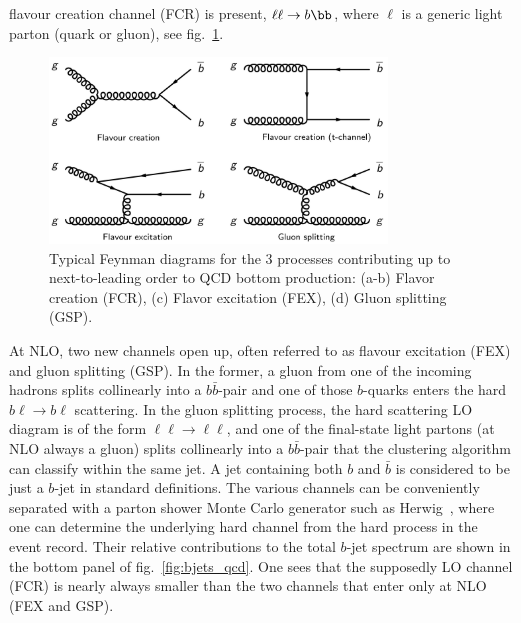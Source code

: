 flavour creation channel (FCR) is present, $\ell \ell \to b\bb$, where $\ell$
is a generic light parton (quark or gluon), see fig.~\ref{fig:qcd_diagrams}.
\begin{figure}[tp]
\centering
\includegraphics[width=0.8\textwidth]{FIGS/bb_diagrams.jpg}
\caption{Typical Feynman diagrams for the 3 processes contributing up to next-to-leading order to QCD bottom production: (a-b) Flavor creation (FCR), (c) Flavor excitation (FEX), (d) Gluon splitting (GSP).}
  \label{fig:qcd_diagrams}
\end{figure}
At NLO, two new channels open up, often referred to as flavour excitation (FEX) and gluon splitting (GSP). In the former, a gluon from one of the incoming hadrons splits collinearly into a $b \bar{b}$-pair and one of those $b$-quarks enters the hard $b\ell \to b\ell$ scattering. In the gluon splitting process, the hard scattering LO diagram is of the form $\ell \ell \to \ell \ell$, and one of the final-state light partons (at NLO always a gluon) splits collinearly into a $b \bar{b}$-pair that the clustering algorithm can classify within the same jet. A jet containing both $b$ and $ \bar{b}$ is considered to be just a $b$-jet in standard definitions.
The various channels can be conveniently separated with a parton shower Monte Carlo generator such as Herwig~\cite{Herwig}, where one can determine the underlying hard channel from the hard process in the event record. Their relative contributions to the total $b$-jet spectrum are shown in the bottom panel of fig.~\ref{fig:bjets_qcd}.  One sees that the supposedly LO channel (FCR) is nearly always smaller than the two channels that enter only at NLO (FEX and GSP). %

